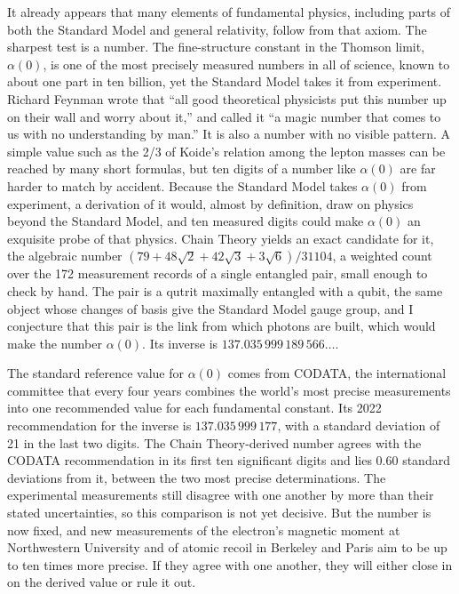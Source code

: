 It already appears that many elements of fundamental physics, including parts of both the Standard Model and general relativity, follow from that axiom. The sharpest test is a number. The fine-structure constant in the Thomson limit, $\alpha(0)$, is one of the most precisely measured numbers in all of science, known to about one part in ten billion, yet the Standard Model takes it from experiment. Richard Feynman wrote that ``all good theoretical physicists put this number up on their wall and worry about it,'' and called it ``a magic number that comes to us with no understanding by man.'' It is also a number with no visible pattern. A simple value such as the 2/3 of Koide's relation among the lepton masses can be reached by many short formulas, but ten digits of a number like $\alpha(0)$ are far harder to match by accident. Because the Standard Model takes $\alpha(0)$ from experiment, a derivation of it would, almost by definition, draw on physics beyond the Standard Model, and ten measured digits could make $\alpha(0)$ an exquisite probe of that physics. Chain Theory yields an exact candidate for it, the algebraic number $(79 + 48\sqrt{2} + 42\sqrt{3} + 3\sqrt{6})/31104$, a weighted count over the 172 measurement records of a single entangled pair, small enough to check by hand. The pair is a qutrit maximally entangled with a qubit, the same object whose changes of basis give the Standard Model gauge group, and I conjecture that this pair is the link from which photons are built, which would make the number $\alpha(0)$. Its inverse is $137.035\,999\,189\,566\ldots$.

The standard reference value for $\alpha(0)$ comes from CODATA, the international committee that every four years combines the world's most precise measurements into one recommended value for each fundamental constant. Its 2022 recommendation for the inverse is $137.035\,999\,177$, with a standard deviation of 21 in the last two digits. The Chain Theory-derived number agrees with the CODATA recommendation in its first ten significant digits and lies 0.60 standard deviations from it, between the two most precise determinations. The experimental measurements still disagree with one another by more than their stated uncertainties, so this comparison is not yet decisive. But the number is now fixed, and new measurements of the electron's magnetic moment at Northwestern University and of atomic recoil in Berkeley and Paris aim to be up to ten times more precise. If they agree with one another, they will either close in on the derived value or rule it out.


